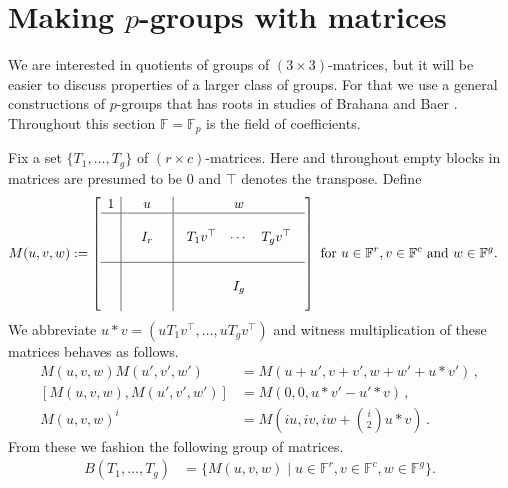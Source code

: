 \documentclass[11pt]{article}
\numberwithin{equation}{section}
\theoremstyle{definition}
\theoremstyle{plain}
\numberwithin{equation}{section}
\theoremstyle{plain}       %
\theoremstyle{remark}
\theoremstyle{definition}
\numberwithin{figure}{section}
\numberwithin{table}{section}
\newcommand{\bbF}{\mathbb{F}}  %
\begin{document}
%
\section{Making \texorpdfstring{$p$}{p}-groups with matrices}\label{sec:making}
We are interested in quotients of groups of $(3\times 3)$-matrices, but it will
be easier to discuss properties of a larger class of groups.  For that we use a
general constructions of $p$-groups that has roots in studies of Brahana and
Baer \cite{Brahana, Baer}.
%
Throughout this section $\bbF=\bbF_p$ is the field of coefficients.

Fix a set $\{T_1,\dots,T_g\}$ of $(r\times c)$-matrices.  Here and throughout
empty blocks in matrices are presumed to be $0$ and $\top$ denotes the
transpose.  Define
\begin{align}\label{def:M}
	M(u,v,w) & :=
	\left[\begin{array}{c|ccc|c}
		1 & & u & & w \\
		\hline
		  & & & & \\	 
		  & & I_r & & 
		   \begin{array}{ccc} T_1v^\top & \cdots & T_g v^\top\end{array} \\
		  & & & &  \\
		 \hline
		  & & & & \\
		  & & & & I_g\\
		  & & & & 
		\end{array}\right]\textnormal{ for } u\in \bbF^r, v\in \bbF^c \textnormal{ and } w\in \bbF^g.
\end{align}
We abbreviate $u*v=(uT_1v^{\top},\ldots,uT_g v^{\top})$ and witness 
multiplication of these matrices behaves as follows.
\begin{align*}
	M(u,v,w)M(u',v',w') & = M(u+u',v+v',
	w+w'+u*v')\,,\\
	[M(u,v,w),M(u',v',w')] & = M(0,0,u*v'-u'*v)\,,\\
	M(u,v,w)^i & = M\left(iu,iv, iw+\binom{i}{2}u *v\right)\,.
\end{align*}
{}From these we fashion the following group of matrices.
\begin{align}\label{eq:Brahana}
	B(T_1,\dots,T_g) & =
		\{ 	M(u,v,w) \mid 
			u\in \bbF^r,	v\in\bbF^c, 
			w\in\bbF^g
	\}.
\end{align}
\end{document}
